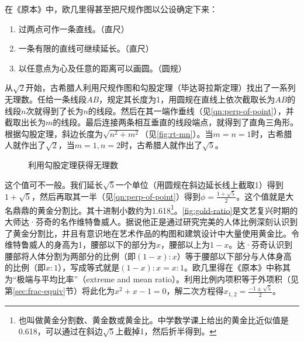 \documentclass[b5paper]{ctexart}
\begin{document}
在《原本》中，欧几里得甚至把尺规作图以公设确定下来：
\begin{enumerate}[(公设1)]
\item 过两点可作一条直线。（直尺）
\item 一条有限的直线可继续延长。（直尺）
\item 以任意点为心及任意的距离可以画圆。（圆规）
\end{enumerate}

从$\sqrt{2}$开始，古希腊人利用尺规作图和勾股定理（毕达哥拉斯定理）找出了一系列无理数。任给一条线段$AB$，规定其长度为1，用圆规在直线上依次截取长为$AB$的线段$n$次就得到了长为$n$的线段。然后在其一端作垂线（见\cref{qn:perp-of-point}），并截取出长为$m$的线段。最后连接两条相互垂直的线段端点，就得到了直角三角形。根据勾股定理，斜边长度为$\sqrt{n^2 + m^2}$（见\cref{fig:rt-mn}）。当$m = n = 1$时，古希腊人就作出了$\sqrt{2}$，当$m=1, n=2$时，古希腊人就作出了$\sqrt{5}$。

\begin{figure}[htbp]
  \centering
  \caption{利用勾股定理获得无理数}
  \label{fig:irrational-tagent}
\end{figure}

这个值可不一般。我们延长$\sqrt{5}$一个单位（用圆规在斜边延长线上截取1）得到$1 + \sqrt{5}$，然后再取其一半（见\cref{qn:perp-of-point}）得到$\phi = \frac{1 + \sqrt{5}}{2}$。这个值就是大名鼎鼎的黄金分割比。其十进制小数约为1.618\footnote{也叫做黄金分割数、黄金数或黄金比。中学数学课上给出的黄金比近似值是0.618，可以通过在斜边$\sqrt{5}$上截掉1，然后折半得到。}。\cref{fig:gold-ratio}是文艺复兴时期的大师达·芬奇的名作维特鲁威人。据说他正是通过研究完美的人体比例深刻认识到了黄金分割比，并且有意识地在艺术作品的构图和建筑设计中大量使用黄金比。令维特鲁威人的身高为1，腰部以下的部分为$x$，腰部以上为$1 - x$。达·芬奇认识到腰部将人体分割为两部分的比例（即$(1 - x) : x$）等于腰部以下部分与人体身高的比例（即$x : 1$），写成等式就是$(1 - x) : x = x : 1$。欧几里得在《原本》中称其为“极端与平均比率”（extreme and mean ratio）。利用比例内项积等于外项积（见第\ref{sec:frac-equiv}节）将此化为$x^2 + x - 1 = 0$，解二次方程得$x_{1, 2} = \frac{-1 \pm \sqrt{5}}{2}$。
\end{document}

